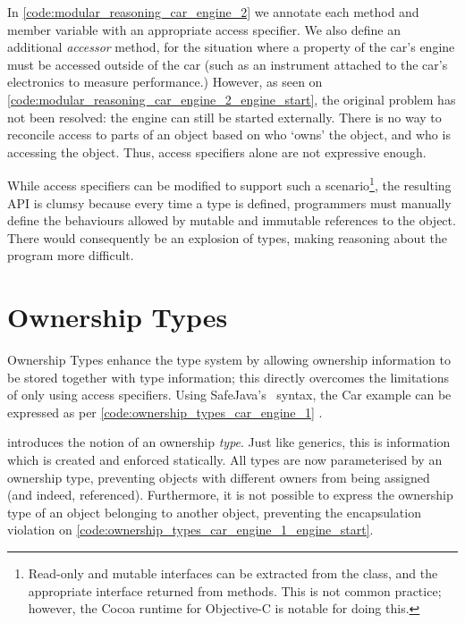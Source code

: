 \documentclass{acm_proc_article-sp}
\begin{document}
In \cref{code:modular_reasoning_car_engine_2} we annotate each method
and member variable with an appropriate access specifier. We also define an
additional \emph{accessor} method, for the situation where a property of the
car's engine must be accessed outside of the car (such as an instrument 
attached to the car's electronics to measure performance.) However, as seen on
\cref{code:modular_reasoning_car_engine_2_engine_start}, the original
problem has not been resolved: the engine can still be started externally.
There is no way to reconcile access to parts of an object based on who `owns'
the object, and who is accessing the object. Thus, access specifiers alone are
not expressive enough.

While access specifiers can be modified to support such a
scenario\footnote{Read-only and mutable interfaces can be extracted from the
class, and the appropriate interface returned from methods. This is not common
practice; however, the Cocoa runtime for Objective-C is notable for doing
this.}, the resulting API is clumsy because every time a type is defined,
programmers must manually define the behaviours allowed by mutable and
immutable references to the object. There would consequently be an explosion of
types, making reasoning about the program more difficult.

\section{Ownership Types}
\label{sec:ownership}

Ownership Types enhance the type system by allowing ownership information to be 
stored together with type information; this directly overcomes the limitations 
of only using access specifiers. Using SafeJava's~\cite{boyapati04safejava} 
syntax, the Car example can be expressed as per 
\cref{code:ownership_types_car_engine_1} 
.

 introduces the notion of an ownership
\emph{type}. Just like generics, this is information which is created and
enforced statically. All types are now parameterised by an ownership type,
preventing objects with different owners from being assigned (and indeed,
referenced). Furthermore, it is not possible to express the ownership type of
an object belonging to another object, preventing the encapsulation violation
on \cref{code:ownership_types_car_engine_1_engine_start}.
\end{document}

